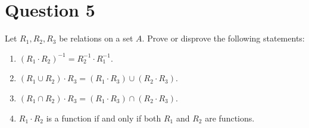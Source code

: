 \documentclass[12pt]{report}
\begin{document}
\section*{Question 5}
Let $R_1, R_2, R_3$ be relations on a set $A$. Prove or disprove the following statements:
\begin{enumerate}[label=(\roman*)]
    \item $(R_1 \cdot R_2)^{-1} = R_2^{-1} \cdot R_1^{-1}$.
    \item $(R_1 \cup R_2) \cdot R_3 = (R_1 \cdot R_3) \cup (R_2 \cdot R_3)$.
    \item $(R_1 \cap R_2) \cdot R_3 = (R_1 \cdot R_3) \cap (R_2 \cdot R_3)$.
    \item $R_1 \cdot R_2$ is a function if and only if both $R_1$ and $R_2$ are functions.
\end{enumerate}
\end{document}
